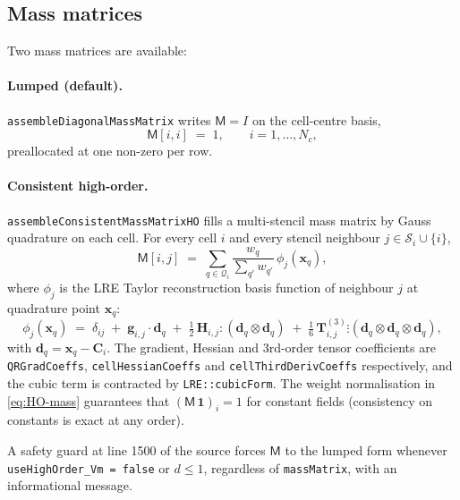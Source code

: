 \documentclass[11pt,a4paper]{article}
\newcommand{\Mmass}{\mathsf{M}}
\newcommand{\code}[1]{\texttt{\small #1}}
\begin{document}
\subsection{Mass matrices}

Two mass matrices are available:

\paragraph{Lumped (default).} \code{assembleDiagonalMassMatrix} writes
$\Mmass = I$ on the cell-centre basis,
\begin{equation}
  \Mmass[i, i] \;=\; 1, \qquad i = 1, \dots, N_{c},
\end{equation}
preallocated at one non-zero per row.

\paragraph{Consistent high-order.}
\code{assembleConsistentMassMatrixHO} fills a multi-stencil mass
matrix by Gauss quadrature on each cell. For every cell $i$ and every
stencil neighbour $j \in \mathcal{S}_{i} \cup \{i\}$,
\begin{equation}
  \Mmass[i, j] \;=\;
   \sum_{q \in \mathcal{Q}_{i}}
       \frac{w_{q}}{\sum_{q'} w_{q'}}\,
       \phi_{j}(\mathbf{x}_{q}),
   \label{eq:HO-mass}
\end{equation}
where $\phi_{j}$ is the LRE Taylor reconstruction basis function of
neighbour $j$ at quadrature point $\mathbf{x}_{q}$:
\begin{equation}
  \phi_{j}(\mathbf{x}_{q})
   \;=\;
   \delta_{ij}
   \;+\; \mathbf{g}_{i,j} \cdot \mathbf{d}_{q}
   \;+\; \tfrac{1}{2}\, \mathbf{H}_{i,j} \!:\! (\mathbf{d}_{q} \otimes \mathbf{d}_{q})
   \;+\; \tfrac{1}{6}\, \mathbf{T}^{(3)}_{i,j} \!\vdots\!
       (\mathbf{d}_{q} \otimes \mathbf{d}_{q} \otimes \mathbf{d}_{q}),
   \label{eq:taylor}
\end{equation}
with $\mathbf{d}_{q} = \mathbf{x}_{q} - \mathbf{C}_{i}$. The gradient,
Hessian and 3rd-order tensor coefficients are
\code{QRGradCoeffs}, \code{cellHessianCoeffs} and
\code{cellThirdDerivCoeffs} respectively, and the cubic term is
contracted by \code{LRE::cubicForm}. The weight normalisation in
\eqref{eq:HO-mass} guarantees that $(\Mmass\,\mathbf{1})_{i} = 1$ for
constant fields (consistency on constants is exact at any order).

A safety guard at line 1500 of the source forces $\Mmass$ to the lumped
form whenever \code{useHighOrder\_Vm = false} or $d \le 1$, regardless
of \code{massMatrix}, with an informational message.
\end{document}
